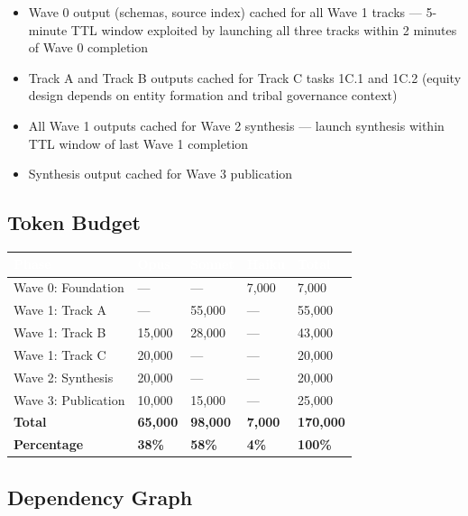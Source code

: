 \documentclass[11pt,letterpaper]{article}
\newcommand{\tableheader}[1]{\textbf{\sffamily\textcolor{white}{#1}}}
\begin{document}
\begin{itemize}[leftmargin=2em]
  \item Wave 0 output (schemas, source index) cached for all Wave 1 tracks --- 5-minute TTL window exploited by launching all three tracks within 2 minutes of Wave 0 completion
  \item Track A and Track B outputs cached for Track C tasks 1C.1 and 1C.2 (equity design depends on entity formation and tribal governance context)
  \item All Wave 1 outputs cached for Wave 2 synthesis --- launch synthesis within TTL window of last Wave 1 completion
  \item Synthesis output cached for Wave 3 publication
\end{itemize}

\subsection{Token Budget}

\begin{center}
\begin{tabularx}{\textwidth}{L{3.5cm}C{2cm}C{2cm}C{2cm}C{2cm}}
\toprule
{}
\tableheader{Phase} & \tableheader{Opus} & \tableheader{Sonnet} & \tableheader{Haiku} & \tableheader{Total} \\
\midrule
Wave 0: Foundation & --- & --- & 7,000 & 7,000 \\
Wave 1: Track A & --- & 55,000 & --- & 55,000 \\
Wave 1: Track B & 15,000 & 28,000 & --- & 43,000 \\
Wave 1: Track C & 20,000 & --- & --- & 20,000 \\
Wave 2: Synthesis & 20,000 & --- & --- & 20,000 \\
Wave 3: Publication & 10,000 & 15,000 & --- & 25,000 \\
\midrule
\textbf{Total} & \textbf{65,000} & \textbf{98,000} & \textbf{7,000} & \textbf{170,000} \\
\textbf{Percentage} & \textbf{38\%} & \textbf{58\%} & \textbf{4\%} & \textbf{100\%} \\
\bottomrule
\end{tabularx}
\end{center}

\subsection{Dependency Graph}
\end{document}
